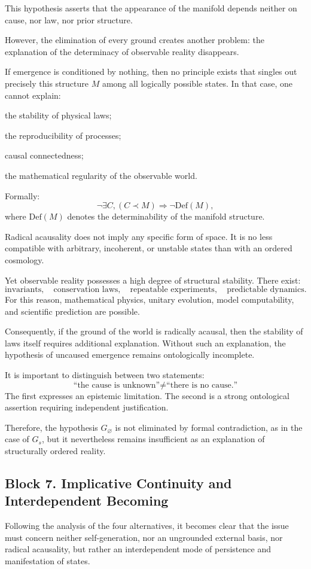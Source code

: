 \documentclass[12pt,a4paper]{article}
\theoremstyle{definition}
\begin{document}
This hypothesis asserts that the appearance of the manifold depends neither on cause, nor law, nor prior structure.

However, the elimination of every ground creates another problem: the explanation of the determinacy of observable reality disappears.

If emergence is conditioned by nothing, then no principle exists that singles out precisely this structure \(M\) among all logically possible states. In that case, one cannot explain:

the stability of physical laws;

the reproducibility of processes;

causal connectedness;

the mathematical regularity of the observable world.

Formally:
\[
\neg\exists C,(C\prec M)
\Rightarrow
\neg\mathrm{Def}(M),
\]
where \(\mathrm{Def}(M)\) denotes the determinability of the manifold structure.

Radical acausality does not imply any specific form of space. It is no less compatible with arbitrary, incoherent, or unstable states than with an ordered cosmology.

Yet observable reality possesses a high degree of structural stability. There exist:
\[
\text{invariants},
\quad
\text{conservation laws},
\quad
\text{repeatable experiments},
\quad
\text{predictable dynamics}.
\]
For this reason, mathematical physics, unitary evolution, model computability, and scientific prediction are possible.

Consequently, if the ground of the world is radically acausal, then the stability of laws itself requires additional explanation. Without such an explanation, the hypothesis of uncaused emergence remains ontologically incomplete.

It is important to distinguish between two statements:
\[
\text{``the cause is unknown''}
\neq
\text{``there is no cause.''}
\]
The first expresses an epistemic limitation. The second is a strong ontological assertion requiring independent justification.

Therefore, the hypothesis \(G_{\varnothing}\) is not eliminated by formal contradiction, as in the case of \(G_s\), but it nevertheless remains insufficient as an explanation of structurally ordered reality.



\subsection{Block 7. Implicative Continuity and Interdependent Becoming}
Following the analysis of the four alternatives, it becomes clear that the issue must concern neither self-generation, nor an ungrounded external basis, nor radical acausality, but rather an interdependent mode of persistence and manifestation of states.
\end{document}
